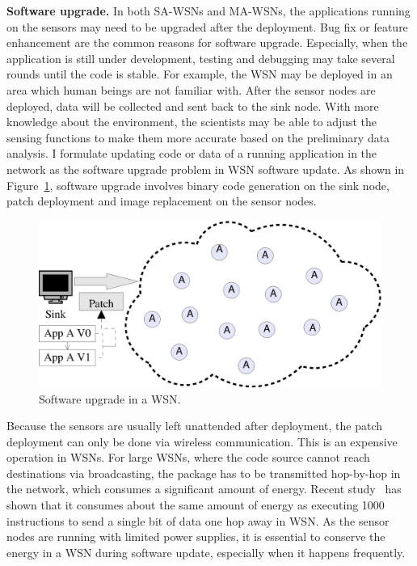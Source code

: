\textbf{Software upgrade.}
In both SA-WSNs and MA-WSNs, the applications running on the sensors may need to be upgraded after the deployment.
Bug fix or feature enhancement are the common reasons for software upgrade.
Especially, when the application is still under development, testing and debugging may take several rounds until the code is stable.
For example, the WSN may be deployed in an area which human beings are not familiar with. After the sensor nodes are deployed, data will be collected and sent back to the sink node. With more knowledge about the environment, the scientists may be able to adjust the sensing functions to make them more accurate based on the preliminary data analysis. I formulate updating code or data of a running application in the network as the software upgrade problem in WSN software update. As shown in Figure~\ref{fig:upgrade}, software upgrade involves binary code generation on the sink node, patch deployment and image replacement on the sensor nodes.
\begin{figure}[htbp]
	\centering
		\includegraphics[scale=0.45]{figures/upgrade.eps}
	\caption{Software upgrade in a WSN.}
	\label{fig:upgrade}
\end{figure}
Because the sensors are usually left unattended after deployment, the patch deployment can only be done via wireless communication.
 This is an expensive operation in WSNs. For large WSNs, where the code source cannot reach destinations via broadcasting, the package has to be transmitted hop-by-hop in the network, which consumes a significant amount of energy. Recent study~\cite{related:barr-energy} has shown that it consumes about the same amount of energy as executing 1000 instructions to send a single bit of data one hop away in WSN. As the sensor nodes are running with limited power supplies, it is essential to conserve the energy in a WSN during software update, especially when it happens frequently.
 
